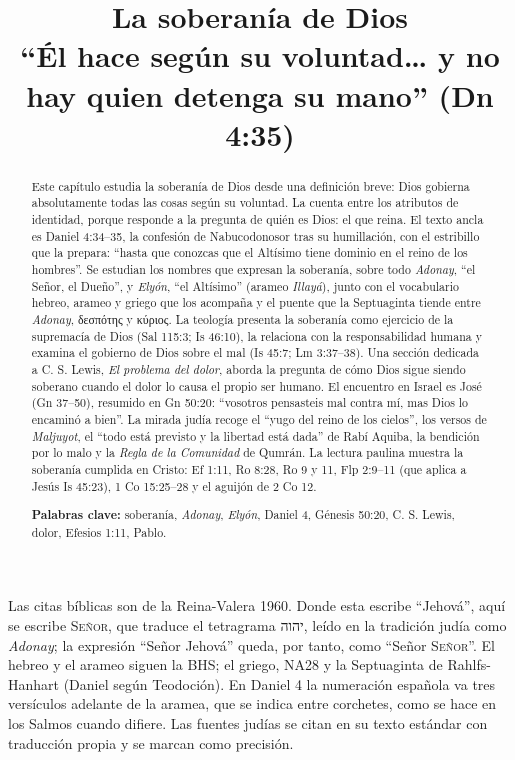 \documentclass[11pt,letterpaper]{article}
\title{\color{azul}\bfseries La soberanía de Dios\\[4pt]\large\color{gris}\mdseries ``Él hace según su voluntad\ldots{} y no hay quien detenga su mano'' (Dn 4:35)}
\author{}\date{}
\newcommand{\heb}[1]{\mbox{\foreignlanguage{hebrew}{#1}}}
\newcommand{\grc}[1]{\foreignlanguage{ancientgreek}{#1}}
\newcommand{\SENOR}{\textsc{Señor}}
\begin{document}
\maketitle\thispagestyle{empty}

\begin{abstract}\noindent
Este capítulo estudia la soberanía de Dios desde una definición breve: Dios gobierna absolutamente todas las cosas según su voluntad. La cuenta entre los atributos de identidad, porque responde a la pregunta de quién es Dios: el que reina. El texto ancla es Daniel 4:34--35, la confesión de Nabucodonosor tras su humillación, con el estribillo que la prepara: ``hasta que conozcas que el Altísimo tiene dominio en el reino de los hombres''. Se estudian los nombres que expresan la soberanía, sobre todo \emph{Adonay}, ``el Señor, el Dueño'', y \emph{Elyón}, ``el Altísimo'' (arameo \emph{Illayá}), junto con el vocabulario hebreo, arameo y griego que los acompaña y el puente que la Septuaginta tiende entre \emph{Adonay}, \grc{δεσπότης} y \grc{κύριος}. La teología presenta la soberanía como ejercicio de la supremacía de Dios (Sal 115:3; Is 46:10), la relaciona con la responsabilidad humana y examina el gobierno de Dios sobre el mal (Is 45:7; Lm 3:37--38). Una sección dedicada a C. S. Lewis, \emph{El problema del dolor}, aborda la pregunta de cómo Dios sigue siendo soberano cuando el dolor lo causa el propio ser humano. El encuentro en Israel es José (Gn 37--50), resumido en Gn 50:20: ``vosotros pensasteis mal contra mí, mas Dios lo encaminó a bien''. La mirada judía recoge el ``yugo del reino de los cielos'', los versos de \emph{Maljuyot}, el ``todo está previsto y la libertad está dada'' de Rabí Aquiba, la bendición por lo malo y la \emph{Regla de la Comunidad} de Qumrán. La lectura paulina muestra la soberanía cumplida en Cristo: Ef 1:11, Ro 8:28, Ro 9 y 11, Flp 2:9--11 (que aplica a Jesús Is 45:23), 1 Co 15:25--28 y el aguijón de 2 Co 12.
\par\smallskip\noindent\textbf{Palabras clave:} soberanía, \emph{Adonay}, \emph{Elyón}, Daniel 4, Génesis 50:20, C. S. Lewis, dolor, Efesios 1:11, Pablo.\end{abstract}

\begin{nota}
Las citas bíblicas son de la Reina-Valera 1960. Donde esta escribe ``Jehová'', aquí se escribe \SENOR, que traduce el tetragrama \heb{יהוה}, leído en la tradición judía como \emph{Adonay}; la expresión ``Señor Jehová'' queda, por tanto, como ``Señor \SENOR''. El hebreo y el arameo siguen la BHS; el griego, NA28 y la Septuaginta de Rahlfs-Hanhart (Daniel según Teodoción). En Daniel 4 la numeración española va tres versículos adelante de la aramea, que se indica entre corchetes, como se hace en los Salmos cuando difiere. Las fuentes judías se citan en su texto estándar con traducción propia y se marcan como precisión.
\end{nota}
\end{document}
